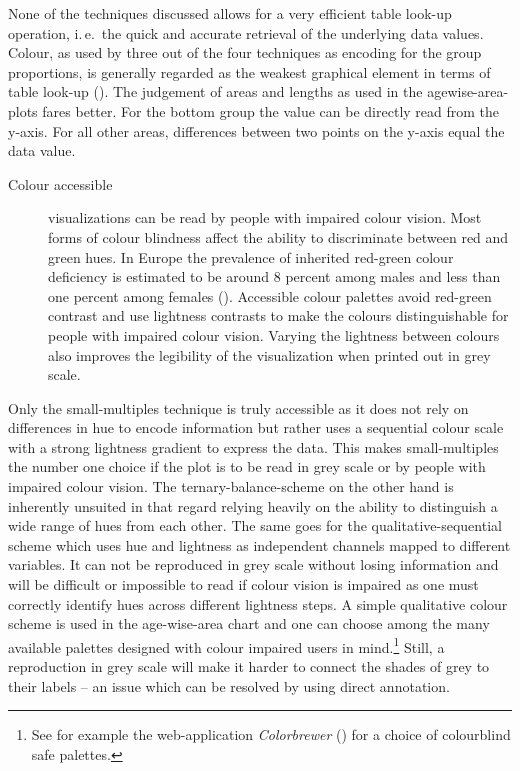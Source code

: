 \documentclass[parskip=half]{scrartcl}
\begin{document}
None of the techniques discussed allows for a very efficient table look-up operation, i.\,e.~the quick and accurate retrieval of the underlying data values. Colour, as used by three out of the four techniques as encoding for the group proportions, is generally regarded as the weakest graphical element in terms of table look-up (\cite{Cleveland1984}). The judgement of areas and lengths as used in the agewise-area-plots fares better. For the bottom group the value can be directly read from the y-axis. For all other areas, differences between two points on the y-axis equal the data value.

\begin{description}
  \item[Colour accessible] visualizations can be read by people with impaired colour vision. Most forms of colour blindness affect the ability to discriminate between red and green hues. In Europe the prevalence of inherited red-green colour deficiency is estimated to be around 8 percent among males and less than one percent among females (\cite{Birch2012}). Accessible colour palettes avoid red-green contrast and use lightness contrasts to make the colours distinguishable for people with impaired colour vision. Varying the lightness between colours also improves the legibility of the visualization when printed out in grey scale.
\end{description}

Only the small-multiples technique is truly accessible as it does not rely on differences in hue to encode information but rather uses a sequential colour scale with a strong lightness gradient to express the data. This makes small-multiples the number one choice if the plot is to be read in grey scale or by people with impaired colour vision. The ternary-balance-scheme on the other hand is inherently unsuited in that regard relying heavily on the ability to distinguish a wide range of hues from each other. The same goes for the qualitative-sequential scheme which uses hue and lightness as independent channels mapped to different variables. It can not be reproduced in grey scale without losing information and will be difficult or impossible to read if colour vision is impaired as one must correctly identify hues across different lightness steps. A simple qualitative colour scheme is used in the age-wise-area chart and one can choose among the many available palettes designed with colour impaired users in mind.\footnote{See for example the web-application \emph{Colorbrewer} (\cite{Brewer2016}) for a choice of colourblind safe palettes.} Still, a reproduction in grey scale will make it harder to connect the shades of grey to their labels -- an issue which can be resolved by using direct annotation.
\end{document}

